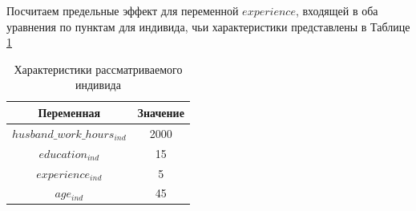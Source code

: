 \documentclass[a4paper,12pt]{article}
\begin{document}
Посчитаем предельные эффект для переменной $experience$, входящей в оба уравнения по пунктам для индивида, чьи характеристики представлены в Таблице \ref{individhet}

\begin{table}[!h]
	\caption{Характеристики рассматриваемого индивида}
	\label{individhet}
	\centering
	\small
	\begin{tabular}{|c|c|}
		\hline
		Переменная &  Значение  \\ 
		\hline
		$husband\_work\_hours_{ind} $ &2000 \\ 
		\hline
		$education_{ind} $ &15 \\ 		
		\hline
		$experience_{ind} $ &5 \\ 	
		\hline
		$age_{ind} $ &45 \\ 	
		\hline
	\end{tabular}
\end{table}
\end{document}
